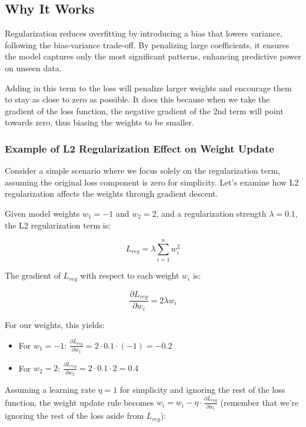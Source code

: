 \documentclass[12pt]{article}
\begin{document}
\subsection{Why It Works}

Regularization reduces overfitting by introducing a bias that lowers variance, following the bias-variance trade-off. By penalizing large coefficients, it ensures the model captures only the most significant patterns, enhancing predictive power on unseen data.

Adding in this term to the loss will penalize larger weights and encourage them to stay as close to zero as possible. It does this because when we take the gradient of the loss function, the negative gradient of the 2nd term will point towards zero, thus biasing the weights to be smaller.

\subsubsection{Example of L2 Regularization Effect on Weight Update}

Consider a simple scenario where we focus solely on the regularization term, assuming the original loss component is zero for simplicity. Let's examine how L2 regularization affects the weights through gradient descent.

Given model weights \(w_1 = -1\) and \(w_2 = 2\), and a regularization strength \(\lambda = 0.1\), the L2 regularization term is:

\[ L_{reg} = \lambda \sum_{i=1}^{n} w_i^2 \]

The gradient of \(L_{reg}\) with respect to each weight \(w_i\) is:

\[ \frac{\partial L_{reg}}{\partial w_i} = 2\lambda w_i \]

For our weights, this yields:

\begin{itemize}
    \item For \(w_1 = -1\): \(\frac{\partial L_{reg}}{\partial w_1} = 2 \cdot 0.1 \cdot (-1) = -0.2\)
    \item For \(w_2 = 2\): \(\frac{\partial L_{reg}}{\partial w_2} = 2 \cdot 0.1 \cdot 2 = 0.4\)
\end{itemize}

Assuming a learning rate \(\eta = 1\) for simplicity and ignoring the rest of the loss function, the weight update rule becomes \(w_i = w_i - \eta \cdot \frac{\partial L_{reg}}{\partial w_i}\) (remember that we're ignoring the rest of the loss aside from \(L_{reg}\)):
\end{document}
